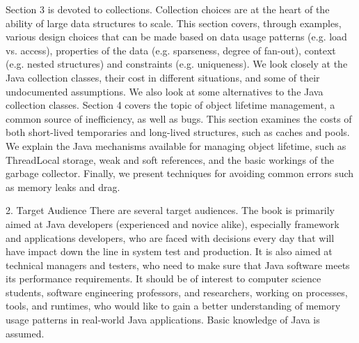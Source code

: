 Section 3 is devoted to collections. Collection choices are at the heart of the ability of large data structures to scale. This section covers, through examples, various design choices that can be made based on data usage patterns (e.g. load vs. access), properties of the data (e.g. sparseness, degree of fan-out), context (e.g. nested structures) and constraints (e.g. uniqueness).  We look closely at the Java collection classes, their cost in different situations, and some of their undocumented assumptions. We also look at some alternatives to the Java collection classes. 
Section 4 covers the topic of object lifetime management, a common source of inefficiency, as well as bugs. This section examines the costs of both short-lived temporaries and long-lived structures, such as caches and pools.  We explain the Java mechanisms available for managing object lifetime, such as ThreadLocal storage, weak and soft references, and the basic workings of the garbage collector. Finally, we present techniques for avoiding common errors such as memory leaks and drag.

2. Target Audience
There are several target audiences. The book is primarily aimed at Java developers (experienced and novice alike), especially framework and applications developers, who are faced with decisions every day that will have impact down the line in system test and production. It is also aimed at technical managers and testers, who need to make sure that Java software meets its performance requirements. It should be of interest to computer science students, software engineering professors, and researchers, working on processes, tools, and runtimes, who would like to gain a better understanding of memory usage patterns in real-world Java applications. Basic knowledge of Java is assumed.


